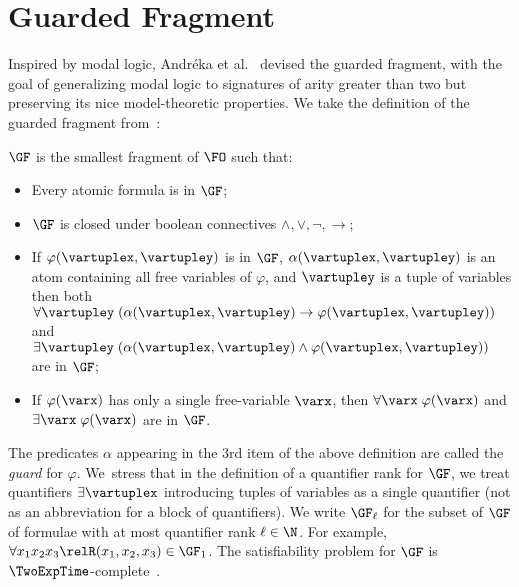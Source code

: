 \section{Guarded Fragment}
Inspired by modal logic, Andréka et al.~\cite{AndrekaNB98} devised the guarded fragment, with the goal of generalizing modal logic to signatures of arity greater than two but preserving its nice model-theoretic properties.
We take the definition of the guarded fragment from~\cite{BednarczykJ22}:
\begin{definition}
  $\GF$ is the smallest fragment of $\FO$  such that:
  \begin{itemize}\itemsep0em
      \item Every atomic formula is in $\GF$;
      \item $\GF$ is closed under boolean connectives $\land, \lor, \neg, \to$;
      \item If $\varphi(\vartuplex, \vartupley)$ is in $\GF$, $\alpha(\vartuplex, \vartupley)$ is an atom containing all free variables of $\varphi$, and $\vartupley$ is a tuple of variables then both $\forall{\vartupley} \; (\alpha(\vartuplex, \vartupley) \to \varphi(\vartuplex, \vartupley))$ and $\exists{\vartupley} \; (\alpha(\vartuplex, \vartupley) \land \varphi(\vartuplex, \vartupley))$ are in $\GF$;
      \item If $\varphi(\varx)$ has only a single free-variable $\varx$, then $\forall{\varx}\; \varphi(\varx)$ and $\exists{\varx}\; \varphi(\varx)$ are in $\GF$.
  \end{itemize}
\end{definition}
The predicates $\alpha$ appearing in the 3rd item of the above definition are called the \emph{guard} for $\varphi$.
We~stress that in the definition of a quantifier rank for $\GF$, we treat quantifiers $\exists{\vartuplex}$ introducing tuples of variables as a single quantifier (not as an abbreviation for a block of quantifiers).
We write $\GF_{\ell}$ for the subset of $\GF$ of formulae with at most quantifier rank $\ell \in \N$.
For example, $\forall{x_{1}x_{2}x_{3}} \relR(x_{1}, x_{2}, x_{3}) \in \GF_{1}$.
The satisfiability problem for $\GF$ is $\TwoExpTime$-complete~\cite{gradel1999a}.

